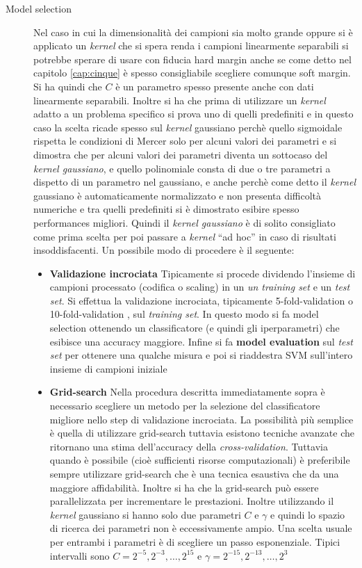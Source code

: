 \begin{description}
\item[Model selection] Nel caso in cui la dimensionalità dei campioni sia molto grande oppure si è applicato un \textit{kernel} che si spera renda i campioni linearmente separabili si potrebbe sperare di usare con fiducia hard margin anche se come detto nel capitolo \ref{cap:cinque} è spesso consigliabile scegliere comunque soft margin. Si ha quindi che $C$ è un parametro spesso presente anche con dati linearmente separabili. Inoltre si ha che prima di utilizzare un \textit{kernel} adatto a un problema specifico si prova uno di quelli predefiniti e in questo caso la scelta ricade spesso sul \textit{kernel} gaussiano perchè quello sigmoidale  rispetta le condizioni di Mercer solo per alcuni valori dei parametri e si dimostra che per alcuni valori dei parametri diventa un sottocaso del \textit{kernel gaussiano}, e quello polinomiale consta di due o tre parametri a dispetto di un parametro nel gaussiano, e anche perchè come detto il \textit{kernel} gaussiano è automaticamente normalizzato e non presenta difficoltà numeriche e tra quelli predefiniti si è dimostrato esibire spesso performances migliori. Quindi il \textit{kernel gaussiano} è di solito consigliato come prima scelta per poi passare a \textit{kernel} ``ad hoc'' in caso di risultati insoddisfacenti. Un possibile modo di procedere è il seguente:
\begin{itemize}
\item \textbf{Validazione incrociata} Tipicamente si procede dividendo l'insieme di campioni processato (codifica o scaling)  in un \textit{un training set} e un \textit{test set}. Si effettua la validazione incrociata, tipicamente 5-fold-validation o 10-fold-validation , sul \textit{training set}. In questo modo si fa model selection ottenendo un classificatore (e quindi gli iperparametri) che esibisce una accuracy maggiore. Infine si fa \textbf{model evaluation} sul \textit{test set} per ottenere una qualche misura e poi si riaddestra \ac{SVM} sull'intero insieme di campioni iniziale  
\item \textbf{Grid-search} Nella procedura descritta immediatamente sopra è necessario scegliere un metodo per la selezione del classificatore migliore nello step di validazione incrociata. La possibilità più semplice è quella di utilizzare grid-search tuttavia esistono tecniche avanzate che ritornano una stima dell'accuracy della \textit{cross-validation}. Tuttavia quando è possibile (cioè sufficienti risorse computazionali) è preferibile sempre utilizzare grid-search che è una tecnica esaustiva che da una maggiore affidabilità. Inoltre si ha che la grid-search può essere parallelizzata per incrementare le prestazioni. Inoltre utilizzando il \textit{kernel} gaussiano si hanno solo due parametri  $C \text{ e } \gamma$ e quindi lo spazio di ricerca dei parametri non è eccessivamente ampio. Una scelta usuale per entrambi i parametri è di scegliere un passo esponenziale. Tipici intervalli sono $C = 2^{-5},2^{-3},\dots,2^{15}$  e $\gamma = 2^{-15},2^{-13},\dots,2^{3}$
\end{itemize}
\end{description}


